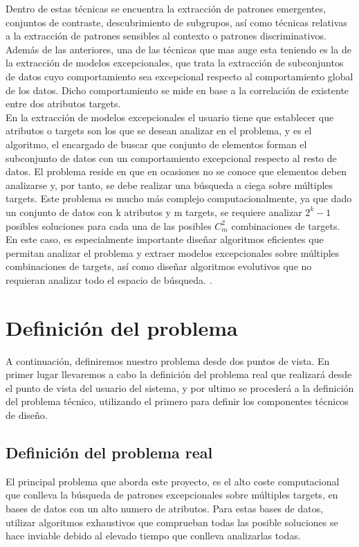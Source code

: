 \documentclass[a4paper, 12pt]{book}
\begin{document}
Dentro de estas técnicas se encuentra la extracción de patrones emergentes, conjuntos de contraste, descubrimiento de subgrupos, así como técnicas relativas a la extracción de patrones sensibles al contexto o patrones discriminativos. Además de las anteriores, una de las técnicas que mas auge esta teniendo es la de la extracción de modelos excepcionales, que trata la extracción de subconjuntos de datos cuyo comportamiento sea excepcional respecto al comportamiento global de los datos. Dicho comportamiento se mide en base a la correlación de existente entre dos atributos targets.\\

En la extracción de modelos excepcionales \cite{} el usuario tiene que establecer que atributos o targets son los que se desean analizar en el problema, y es el algoritmo, el encargado de buscar que conjunto de elementos forman el subconjunto de datos con un comportamiento excepcional respecto al resto de datos. El problema reside en que en ocasiones no se conoce que elementos deben analizarse y, por tanto, se debe realizar una búsqueda a ciega sobre múltiples targets. Este problema es mucho más complejo computacionalmente, ya que dado un conjunto de datos con k atributos y m targets, se requiere analizar $2^k-1$ posibles soluciones para cada una de las posibles $C_m^2$ combinaciones de targets. En este caso, es especialmente importante diseñar algoritmos eficientes que permitan analizar el problema y extraer modelos excepcionales sobre múltiples combinaciones de targets, así como diseñar algoritmos evolutivos que no requieran analizar todo el espacio de búsqueda. \cite{}.

\newpage
\section{Definición del problema}

A continuación, definiremos nuestro problema desde dos puntos de vista. En primer lugar llevaremos a cabo la definición del problema real que realizará desde el punto de vista del usuario del sistema, y por ultimo se procederá a la definición del problema técnico, utilizando el primero para definir los componentes técnicos de diseño.

\subsection{Definición del problema real}

El principal problema que aborda este proyecto, es el alto coste computacional que conlleva la búsqueda de patrones excepcionales sobre múltiples targets, en bases de datos con un alto numero de atributos. Para estas bases de datos, utilizar algoritmos exhaustivos que comprueban todas las posible soluciones se hace inviable debido al elevado tiempo que conlleva analizarlas todas.\\
\end{document}
